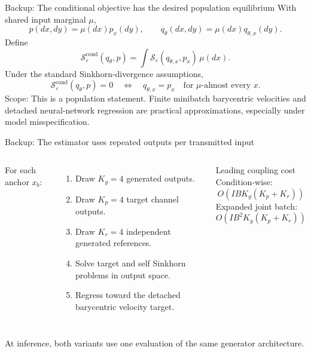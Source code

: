 \documentclass[english,xcolor=dvipsnames,aspectratio=169,10pt]{beamer}
\begin{document}
\begin{frame}{Backup: The conditional objective has the desired population equilibrium}
\small
With shared input marginal $\mu$,
\[
p(dx,dy)=\mu(dx)p_x(dy),\qquad q_\theta(dx,dy)=\mu(dx)q_{\theta,x}(dy).
\]
Define
\[
\mathcal S^{\mathrm{cond}}_\varepsilon(q_\theta,p)
=\int \mathcal S_\varepsilon(q_{\theta,x},p_x)\,\mu(dx).
\]
Under the standard Sinkhorn-divergence assumptions,
\[
\mathcal S^{\mathrm{cond}}_\varepsilon(q_\theta,p)=0
\quad\Longleftrightarrow\quad
q_{\theta,x}=p_x\quad\text{for $\mu$-almost every }x.
\]
\vspace{0.3cm}
\alert{Scope:} This is a population statement. Finite minibatch barycentric velocities and detached neural-network regression are practical approximations, especially under model misspecification.
\end{frame}

\begin{frame}{Backup: The estimator uses repeated outputs per transmitted input}
\begin{columns}[T,onlytextwidth]
For each anchor $x_b$:
\begin{enumerate}\setlength\itemsep{0.42em}
\item Draw $K_g=4$ generated outputs.
\item Draw $K_p=4$ target channel outputs.
\item Draw $K_r=4$ independent generated references.
\item Solve target and self Sinkhorn problems in output space.
\item Regress toward the detached barycentric velocity target.
\end{enumerate}
\begin{block}{Leading coupling cost}
\small
Condition-wise:
\[
O\!\left(IBK_g(K_p+K_r)\right)
\]
Expanded joint batch:
\[
O\!\left(IB^2K_g(K_p+K_r)\right)
\]
\end{block}
\end{columns}
\vspace{0.35cm}
\centering\color{muted}\small At inference, both variants use one evaluation of the same generator architecture.
\end{frame}
\end{document}
